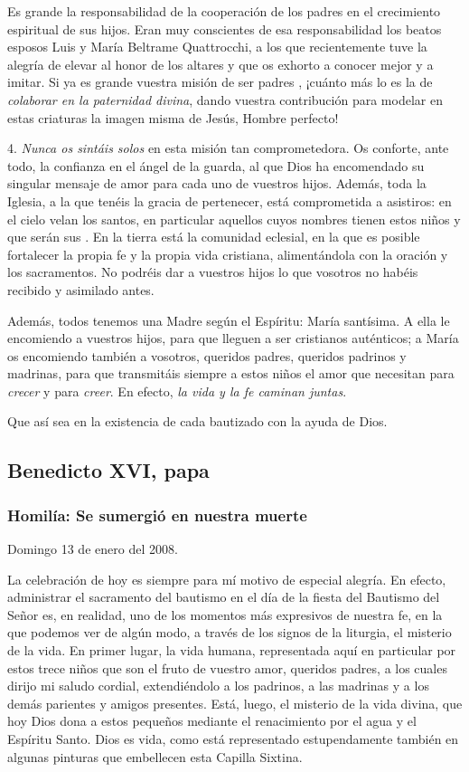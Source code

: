 \begin{body}
\begin{body}
{Es grande la responsabilidad de la cooperación de los padres en el crecimiento espiritual de sus hijos. Eran muy conscientes de esa responsabilidad los beatos esposos Luis y María Beltrame Quattrocchi, a los que recientemente tuve la alegría de elevar al honor de los altares y que os exhorto a conocer mejor y a imitar. Si ya es grande vuestra misión de ser padres , ¡cuánto más lo es la de \emph{colaborar en la paternidad divina}, dando vuestra contribución para modelar en estas criaturas la imagen misma de Jesús, Hombre perfecto!

4. \emph{Nunca os sintáis solos} en esta misión tan comprometedora. Os conforte, ante todo, la confianza en el ángel de la guarda, al que Dios ha encomendado su singular mensaje de amor para cada uno de vuestros hijos. Además, toda la Iglesia, a la que tenéis la gracia de pertenecer, está comprometida a asistiros: en el cielo velan los santos, en particular aquellos cuyos nombres tienen estos niños y que serán sus . En la tierra está la comunidad eclesial, en la que es posible fortalecer la propia fe y la propia vida cristiana, alimentándola con la oración y los sacramentos. No podréis dar a vuestros hijos lo que vosotros no habéis recibido y asimilado antes.

Además, todos tenemos una Madre según el Espíritu: María santísima. A ella le encomiendo a vuestros hijos, para que lleguen a ser cristianos auténticos; a María os encomiendo también a vosotros, queridos padres, queridos padrinos y madrinas, para que transmitáis siempre a estos niños el amor que necesitan para \emph{crecer} y para \emph{creer}. En efecto, \emph{la vida y la fe caminan juntas}.

Que así sea en la existencia de cada bautizado con la ayuda de Dios.

\subsection{Benedicto XVI, papa}

\subsubsection{Homilía: Se sumergió en nuestra muerte}

Domingo 13 de enero del 2008.

La celebración de hoy es siempre para mí motivo de especial alegría. En efecto, administrar el sacramento del bautismo en el día de la fiesta del Bautismo del Señor es, en realidad, uno de los momentos más expresivos de nuestra fe, en la que podemos ver de algún modo, a través de los signos de la liturgia, el misterio de la vida. En primer lugar, la vida humana, representada aquí en particular por estos trece niños que son el fruto de vuestro amor, queridos padres, a los cuales dirijo mi saludo cordial, extendiéndolo a los padrinos, a las madrinas y a los demás parientes y amigos presentes. Está, luego, el misterio de la vida divina, que hoy Dios dona a estos pequeños mediante el renacimiento por el agua y el Espíritu Santo. Dios es vida, como está representado estupendamente también en algunas pinturas que embellecen esta Capilla Sixtina.

}
\end{body}
\end{body}
